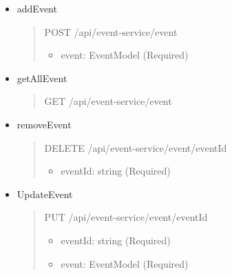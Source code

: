 \begin{itemize}
	\item addEvent
	      \begin{quote}
		      POST /api/event-service/event
		      \begin{itemize}
			      \item event: EventModel (Required)
		      \end{itemize}
	      \end{quote}

	\item getAllEvent
	      \begin{quote}
		      GET /api/event-service/event
	      \end{quote}

	\item removeEvent
	      \begin{quote}
		      DELETE /api/event-service/event/{eventId}
		      \begin{itemize}
			      \item eventId: string (Required)
		      \end{itemize}
	      \end{quote}

	\item UpdateEvent
	      \begin{quote}
		      PUT /api/event-service/event/{eventId}
		      \begin{itemize}
			      \item eventId: string (Required)
			      \item event: EventModel (Required)
		      \end{itemize}
	      \end{quote}
\end{itemize}

